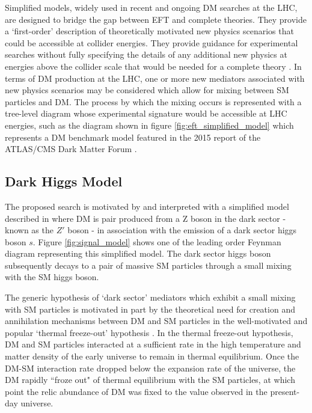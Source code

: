 \documentclass[12pt]{article}
\begin{document}
Simplified models, widely used in recent and ongoing DM searches at the LHC, are designed to bridge the gap between EFT and complete theories. They provide a `first-order' description of theoretically motivated new physics scenarios that could be accessible at collider energies. They provide guidance for experimental searches without fully specifying the details of any additional new physics at energies above the collider scale that would be needed for a complete theory \cite{DM_colliders}. In terms of DM production at the LHC, one or more new mediators associated with new physics scenarios may be considered which allow for mixing between SM particles and DM. The process by which the mixing occurs is represented with a tree-level diagram whose experimental signature would be accessible at LHC energies, such as the diagram shown in figure \ref{fig:eft_simplified_model} which represents a DM benchmark model featured in the 2015 report of the ATLAS/CMS Dark Matter Forum \cite{dm_forum}.

\subsection{Dark Higgs Model}

The proposed search is motivated by and interpreted with a simplified model described in \cite{dark_higgs} where DM is pair produced from a Z boson in the dark sector - known as the $Z'$ boson - in association with the emission of a dark sector higgs boson $s$. Figure \ref{fig:signal_model} shows one of the leading order Feynman diagram representing this simplified model. The dark sector higgs boson subsequently decays to a pair of massive SM particles through a small mixing with the SM higgs boson. 

The generic hypothesis of `dark sector' mediators which exhibit a small mixing with SM particles is motivated in part by the theoretical need for creation and annihilation mechanisms between DM and SM particles in the well-motivated and popular `thermal freeze-out' hypothesis \cite{particle_dm}. In the thermal freeze-out hypothesis, DM and SM particles interacted at a sufficient rate in the high temperature and matter density of the early universe to remain in thermal equilibrium. Once the DM-SM interaction rate dropped below the expansion rate of the universe, the DM rapidly ``froze out" of thermal equilibrium with the SM particles, at which point the relic abundance of DM was fixed to the value observed in the present-day universe.
\end{document}
